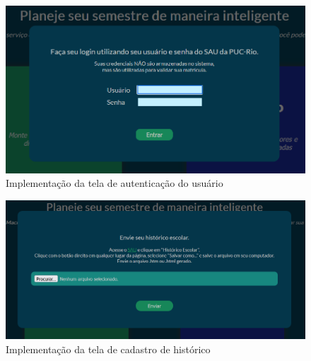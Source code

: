 \begin{figure}[ht]
    \begin{center}
    \includegraphics[width=360pt]{figuras/autenticacao-usuario.png}
    \caption{Implementação da tela de autenticação do usuário}
    \label{fig:tela-autenticacao-impl}
    \end{center}
\end{figure}

\begin{figure}[ht]
    \begin{center}
    \includegraphics[width=360pt]{figuras/cadastro-historico.png}
    \caption{Implementação da tela de cadastro de histórico}
    \label{fig:tela-historico-impl}
    \end{center}
\end{figure}

